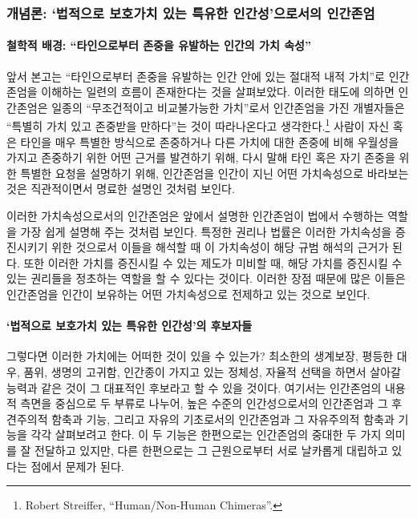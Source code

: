 \subsubsection{개념론: `법적으로 보호가치 있는 특유한 인간성'으로서의 인간존엄}

\paragraph{철학적 배경: ``타인으로부터 존중을 유발하는 인간의 가치 속성''}

앞서 본고는 ``타인으로부터 존중을 유발하는 인간 안에 있는 절대적 내적 가치''로 인간존엄을 이해하는 일련의 흐름이 존재한다는 것을 살펴보았다. 이러한 태도에 의하면 인간존엄은 일종의 ``무조건적이고 비교불가능한 가치''로서 인간존엄을 가진 개별자들은 ``특별히 가치 있고 존중받을 만하다''는 것이 따라나온다고 생각한다.\footnote{Robert Streiffer, ``Human/Non-Human Chimeras''.} 사람이 자신 혹은 타인을 매우 특별한 방식으로 존중하거나 다른 가치에 대한 존중에 비해 우월성을 가지고 존중하기 위한 어떤 근거를 발견하기 위해, 다시 말해 타인 혹은 자기 존중을 위한 특별한 요청을 설명하기 위해, 인간존엄을 인간이 지닌 어떤 가치속성으로 바라보는 것은 직관적이면서 명료한 설명인 것처럼 보인다.

이러한 가치속성으로서의 인간존엄은 앞에서 설명한 인간존엄이 법에서 수행하는 역할을 가장 쉽게 설명해 주는 것처럼 보인다. 특정한 권리나 법률은 이러한 가치속성을 증진시키기 위한 것으로서 이들을 해석할 때 이 가치속성이 해당 규범 해석의 근거가 된다. 또한 이러한 가치를 증진시킬 수 있는 제도가 미비할 때, 해당 가치를 증진시킬 수 있는 권리들을 정초하는 역할을 할 수 있다는 것이다. 이러한 장점 때문에 많은 이들은 인간존엄을 인간이 보유하는 어떤 가치속성으로 전제하고 있는 것으로 보인다.

\paragraph{`법적으로 보호가치 있는 특유한 인간성'의 후보자들}

그렇다면 이러한 가치에는 어떠한 것이 있을 수 있는가? 최소한의 생계보장, 평등한 대우, 품위, 생명의 고귀함, 인간종이 가지고 있는 정체성, 자율적 선택을 하면서 살아갈 능력과 같은 것이 그 대표적인 후보라고 할 수 있을 것이다. 여기서는 인간존엄의 내용적 측면을 중심으로 두 부류로 나누어, 높은 수준의 인간성으로서의 인간존엄과 그 후견주의적 함축과 기능, 그리고 자유의 기초로서의 인간존엄과 그 자유주의적 함축과 기능을 각각 살펴보려고 한다. 이 두 기능은 한편으로는 인간존엄의 중대한 두 가지 의미를 잘 전달하고 있지만, 다른 한편으로는 그 근원으로부터 서로 날카롭게 대립하고 있다는 점에서 문제가 된다.

